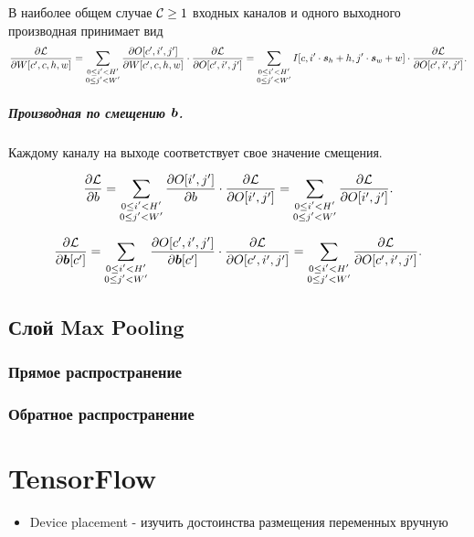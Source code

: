 \documentclass{report}
\numberwithin{theorem}{chapter}
\numberwithin{statement}{chapter}
\numberwithin{lemma}{chapter}
\theoremstyle{definition}
\numberwithin{task}{chapter}
\theoremstyle{remark}
\numberwithin{example}{chapter}
\theoremstyle{definition}
\numberwithin{definition}{chapter}
\theoremstyle{remark}
\theoremstyle{remark}
\numberwithin{lyrics}{section}
\begin{document}
В наиболее общем случае $\mathcal{C}\ge 1$ входных каналов и одного выходного производная принимает вид
\begin{gather}
\frac{\partial \mathcal{L} }{\partial W[c', c, h, w]} = \sum\limits_{\substack{0 \le i' < H' \\ 0 \le j' < W'}} \frac{\partial O[c', i', j'] }{\partial W[c', c, h, w]} \cdot  \frac{\partial \mathcal{L} }{\partial O[c', i', j']} = \sum\limits_{\substack{0 \le i' < H' \\ 0 \le j' < W'}} I[c, i' \cdot \boldsymbol{s}_h + h, j' \cdot \boldsymbol{s}_w + w] \cdot \frac{\partial \mathcal{L} }{\partial O[c', i', j']}.
\end{gather}

\paragraph{Производная по смещению $\boldsymbol{b}$.}
Каждому каналу на выходе соответствует свое значение смещения.

\begin{equation}
\frac{\partial \mathcal{L} }{\partial b} = \sum\limits_{\substack{0 \le i' < H' \\ 0 \le j' < W'}} \frac{\partial O[i', j'] }{\partial b} \cdot \frac{\partial \mathcal{L} }{\partial O[i', j']} = \sum\limits_{\substack{0 \le i' < H' \\ 0 \le j' < W'}} \frac{\partial \mathcal{L} }{\partial O[i', j']}.
\end{equation}

\begin{equation}
\frac{\partial \mathcal{L} }{\partial \boldsymbol{b}[c']} = \sum\limits_{\substack{0 \le i' < H' \\ 0 \le j' < W'}} \frac{\partial O[c', i', j'] }{\partial \boldsymbol{b}[c']} \cdot \frac{\partial \mathcal{L} }{\partial O[c', i', j']} = \sum\limits_{\substack{0 \le i' < H' \\ 0 \le j' < W'}} \frac{\partial \mathcal{L} }{\partial O[c', i', j']}.
\end{equation}

\section{Слой Max Pooling}

\subsection{Прямое распространение}



\subsection{Обратное распространение}

\chapter{TensorFlow}

\begin{itemize}
	\item Device placement - изучить достоинства размещения переменных вручную
\end{itemize}



\end{document}
